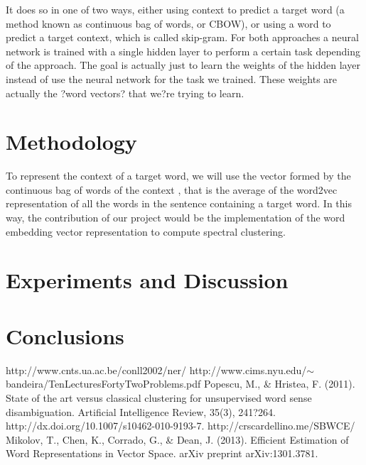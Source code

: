 \documentclass[]{article}
\begin{document}
It does so in one of two ways, either using context to predict a target word (a method known as continuous bag of words, or CBOW), or using a word to predict a target context, which is called skip-gram. For both approaches a neural network is trained with a single hidden layer to perform a certain task depending of the approach. The goal is actually just to learn the weights of the hidden layer instead of use the neural network for the task we trained. These weights are actually the ?word vectors? that we?re trying to learn.

\section{Methodology}

To represent the context of a target word, we will use the vector formed by the continuous bag of words of the context \cite{vecSp}, that is the average of the word2vec \cite{word2vec} representation of all the words in the sentence containing a target word. In this way, the contribution of our project would be the implementation of the word embedding vector representation to compute spectral clustering. \\

\section{Experiments and Discussion}


\section{Conclusions}
  
\pagestyle{myheadings}
\thispagestyle{plain}


\begin{thebibliography}{1}
   http://www.cnts.ua.ac.be/conll2002/ner/
  http://www.cims.nyu.edu/$\sim$bandeira/TenLecturesFortyTwoProblems.pdf
   Popescu, M., \& Hristea, F. (2011). State of the art versus classical clustering for unsupervised word sense disambiguation. Artificial Intelligence Review, 35(3), 241?264. http://dx.doi.org/10.1007/s10462-010-9193-7.  
   http://crscardellino.me/SBWCE/
    Mikolov, T., Chen, K., Corrado, G., \& Dean, J. (2013). Efficient Estimation of Word Representations in Vector Space. arXiv preprint arXiv:1301.3781. 
   
\end{thebibliography} 
\end{document}
